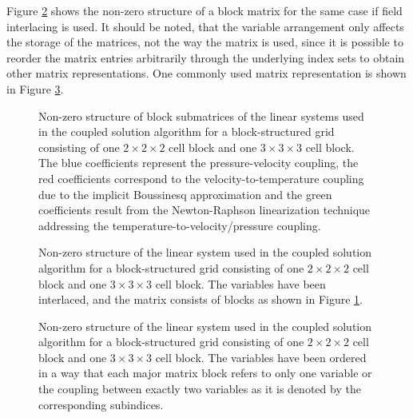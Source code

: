 Figure \ref{fig:interlacemat} shows the non-zero structure of a block matrix for the same case if field interlacing is used. It should be noted, that the variable arrangement only affects the storage of the matrices, not the way the matrix is used, since it is possible to reorder the matrix entries arbitrarily through the underlying index sets to obtain other matrix representations. One commonly used matrix representation is shown in Figure \ref{fig:nointerlacemat}.

\begin{figure}
  \centering
  
  \caption{Non-zero structure of block submatrices of the linear systems used in the coupled solution algorithm for a block-structured grid consisting of one $2\times2\times2$ cell block and one $3\times3\times3$ cell block. The blue coefficients represent the pressure-velocity coupling, the red coefficients correspond to the velocity-to-temperature coupling due to the implicit Boussinesq approximation and the green coefficients result from the Newton-Raphson linearization technique addressing the temperature-to-velocity/pressure coupling.}
  \label{fig:cpldassemble}
\end{figure}

\begin{figure}
  \centering
  
  \caption{Non-zero structure of the linear system used in the coupled solution algorithm for a block-structured grid consisting of one $2\times2\times2$ cell block and one $3\times3\times3$ cell block. The variables have been interlaced, and the matrix consists of blocks as shown in Figure \ref{fig:cpldassemble}.}
  \label{fig:interlacemat}
\end{figure}

\begin{figure}
  \centering
   
  \caption{Non-zero structure of the linear system used in the coupled solution algorithm for a block-structured grid consisting of one $2\times2\times2$ cell block and one $3\times3\times3$ cell block. The variables have been ordered in a way that each major matrix block refers to only one variable or the coupling between exactly two variables as it is denoted by the corresponding subindices.}
  \label{fig:nointerlacemat}
\end{figure}

